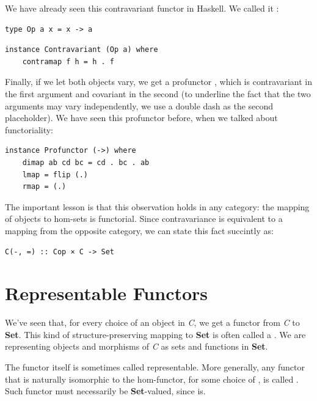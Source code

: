 We have already seen this contravariant functor in Haskell. We called it
:

\begin{Verbatim}[commandchars=\\\{\}]
type Op a x = x -> a
\end{Verbatim}
\begin{Verbatim}[commandchars=\\\{\}]
instance Contravariant (Op a) where
    contramap f h = h . f
\end{Verbatim}
Finally, if we let both objects vary, we get a profunctor
, which is contravariant in the first argument and
covariant in the second (to underline the fact that the two arguments
may vary independently, we use a double dash as the second placeholder).
We have seen this profunctor before, when we talked about functoriality:

\begin{Verbatim}[commandchars=\\\{\}]
instance Profunctor (->) where
    dimap ab cd bc = cd . bc . ab
    lmap = flip (.)
    rmap = (.)
\end{Verbatim}
The important lesson is that this observation holds in any category: the
mapping of objects to hom-sets is functorial. Since contravariance is
equivalent to a mapping from the opposite category, we can state this
fact succintly as:

\begin{Verbatim}[commandchars=\\\{\}]
C(-, =) :: Cop × C -> Set
\end{Verbatim}

\section{Representable Functors}\label{representable-functors}

We've seen that, for every choice of an object  in \emph{C},
we get a functor from \emph{C} to \textbf{Set}. This kind of
structure-preserving mapping to \textbf{Set} is often called a
. We are representing objects and morphisms of
\emph{C} as sets and functions in \textbf{Set}.

The functor  itself is sometimes called representable.
More generally, any functor  that is naturally isomorphic to
the hom-functor, for some choice of , is called
. Such functor must necessarily be
\textbf{Set}-valued, since  is.

